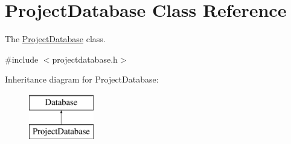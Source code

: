 \hypertarget{classProjectDatabase}{\section{Project\-Database Class Reference}
\label{classProjectDatabase}
}


The \hyperlink{classProjectDatabase}{Project\-Database} class.  




{\ttfamily \#include $<$projectdatabase.\-h$>$}

Inheritance diagram for Project\-Database\-:\begin{figure}[H]
\begin{center}
\leavevmode
\includegraphics[height=2.000000cm]{d4/d8d/classProjectDatabase}
\end{center}
\end{figure}
